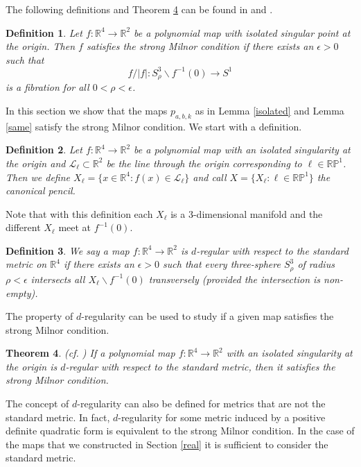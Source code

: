 \documentclass[notitlepage,12pt]{revtex4-1}
\newtheorem{theorem}{\bf Theorem}[section]
\newtheorem{definition}[theorem]{\bf Definition}
\begin{document}
The following definitions and Theorem \ref{dimp} can be found in \cite{cisneros:2010real} and \cite{cisneros:2011real}.

\begin{definition}
Let $f:\mathbb{R}^4\to\mathbb{R}^2$ be a polynomial map with isolated singular point at the origin. Then $f$ satisfies the \textit{strong Milnor condition} if there exists an $\epsilon>0$ such that 
\begin{equation}
f/|f|:S^{3}_{\rho}\backslash f^{-1}(0)\to S^1
\end{equation}
is a fibration for all $0<\rho<\epsilon$.
\end{definition}

In this section we show that the maps $p_{a,b,k}$ as in Lemma \ref{isolated} and Lemma \ref{same} satisfy the strong Milnor condition. We start with a definition.
\begin{definition}
Let $f:\mathbb{R}^4\to\mathbb{R}^2$ be a polynomial map with an isolated singularity at the origin and $\mathcal{L}_{\ell}\subset \mathbb{R}^2$ be the line through the origin corresponding to $\ell\in\mathbb{RP}^1$. Then we define $X_{\ell}=\{x\in\mathbb{R}^4:f(x)\in \mathcal{L}_{\ell}\}$ and call $X=\{X_{\ell}:\ell\in\mathbb{RP}^1\}$ the canonical pencil.
\end{definition}

Note that with this definition each $X_{\ell}$ is a 3-dimensional manifold and the different $X_{\ell}$ meet at $f^{-1}(0)$.

\begin{definition}
We say a map $f:\mathbb{R}^4\to\mathbb{R}^2$ is $d$-regular with respect to the standard metric on $\mathbb{R}^4$ if there exists an $\epsilon>0$ such that every three-sphere $S^{3}_{\rho}$ of radius $\rho<\epsilon$ intersects all $X_{\ell}\backslash f^{-1}(0)$ transversely (provided the intersection is non-empty).
\end{definition}

The property of $d$-regularity can be used to study if a given map satisfies the strong Milnor condition.
\begin{theorem}
\label{dimp}
(cf. \cite{cisneros:2010real})
If a polynomial map $f:\mathbb{R}^4\to\mathbb{R}^2$ with an isolated singularity at the origin is $d$-regular with respect to the standard metric, then it satisfies the strong Milnor condition.
\end{theorem}

The concept of $d$-regularity can also be defined for metrics that are not the standard metric. In fact, $d$-regularity for some metric induced by a positive definite quadratic form is equivalent to the strong Milnor condition. In the case of the maps that we constructed in Section \ref{real} it is sufficient to consider the standard metric.
\end{document}
